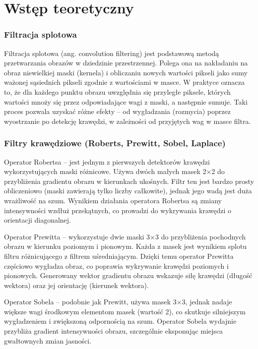 \section{Wstęp teoretyczny}

\subsubsection{Filtracja splotowa}

Filtracja splotowa (ang. convolution filtering) jest podstawową metodą przetwarzania obrazów w dziedzinie przestrzennej. Polega ona na nakładaniu na obraz niewielkiej maski (kernela) i obliczaniu nowych wartości pikseli jako sumy ważonej sąsiednich pikseli zgodnie z wartościami w masce. W praktyce oznacza to, że dla każdego punktu obrazu uwzględnia się przyległe piksele, których wartości mnoży się przez odpowiadające wagi z maski, a następnie sumuje. Taki proces pozwala uzyskać różne efekty – od wygładzania (rozmycia) poprzez wyostrzanie po detekcję krawędzi, w zależności od przyjętych wag w masce filtra.

\subsubsection{Filtry krawędziowe (Roberts, Prewitt, Sobel, Laplace)}

Operator Robertsa – jest jednym z pierwszych detektorów krawędzi wykorzystujących maski różnicowe. Używa dwóch małych masek 2×2 do przybliżenia gradientu obrazu w kierunkach ukośnych. Filtr ten jest bardzo prosty obliczeniowo (maski zawierają tylko liczby całkowite), jednak jego wadą jest duża wrażliwość na szum. Wynikiem działania operatora Robertsa są zmiany intensywności wzdłuż przekątnych, co prowadzi do wykrywania krawędzi o orientacji diagonalnej.

Operator Prewitta – wykorzystuje dwie maski 3×3 do przybliżenia pochodnych obrazu w kierunku poziomym i pionowym. Każda z masek jest wynikiem splotu filtru różnicującego z filtrem uśredniającym. Dzięki temu operator Prewitta częściowo wygładza obraz, co poprawia wykrywanie krawędzi poziomych i pionowych. Generowany wektor gradientu obrazu wskazuje siłę krawędzi (długość wektora) oraz jej orientację (kierunek wektora).

Operator Sobela – podobnie jak Prewitt, używa masek 3×3, jednak nadaje większe wagi środkowym elementom masek (wartość 2), co skutkuje silniejszym wygładzeniem i zwiększoną odpornością na szum. Operator Sobela wydajnie przybliża gradient intensywności obrazu, szczególnie eksponując miejsca gwałtownych zmian jasności.

